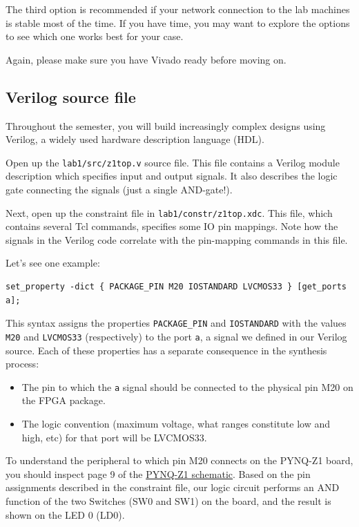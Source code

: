\documentclass[11pt]{article}
\begin{document}
The third option is recommended if your network connection to the lab machines is stable most of the time. If you have time, you may want to explore the options to see which one works best for your case.

Again, please make sure you have Vivado ready before moving on.

\subsection{Verilog source file}
Throughout the semester, you will build increasingly complex designs using Verilog, a widely used hardware description language (HDL).

Open up the \verb|lab1/src/z1top.v| source file.
This file contains a Verilog module description which specifies input and output signals. It also describes the logic gate connecting the signals (just a single AND-gate!).

Next, open up the constraint file in \verb|lab1/constr/z1top.xdc|.
This file, which contains several Tcl commands, specifies some IO pin mappings. Note how the signals in the Verilog code correlate with the pin-mapping commands in this file.

Let's see one example:

\begin{verbatim}
set_property -dict { PACKAGE_PIN M20 IOSTANDARD LVCMOS33 } [get_ports a];
\end{verbatim}

This syntax assigns the properties \verb|PACKAGE_PIN| and \verb|IOSTANDARD| with the values \verb|M20| and \verb|LVCMOS33| (respectively) to the port \verb|a|, a signal we defined in our Verilog source. Each of these properties has a separate consequence in the synthesis process:

\begin{itemize}
  \item The pin to which the \verb|a| signal should be connected to the physical pin M20 on the FPGA package.
  \item The logic convention (maximum voltage, what ranges constitute low and high, etc) for that port will be LVCMOS33.
\end{itemize}

To understand the peripheral to which pin M20 connects on the PYNQ-Z1 board, you should inspect page 9 of the \href{https://reference.digilentinc.com/_media/reference/programmable-logic/pynq-z1/pynq-z1\_sch.pdf}{PYNQ-Z1 schematic}. Based on the pin assignments described in the constraint file, our logic circuit performs an AND function of the two Switches (SW0 and SW1) on the board, and the result is shown on the LED 0 (LD0).
\end{document}
